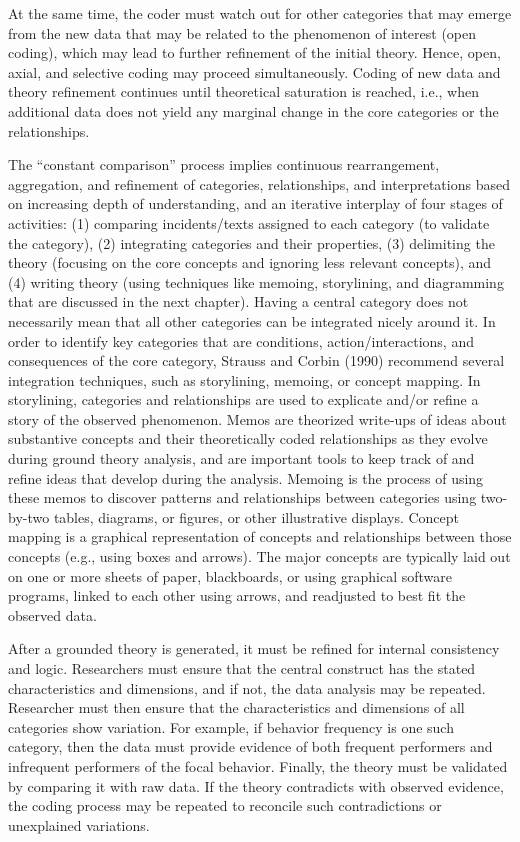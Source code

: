 At the same time, the coder must watch out for other categories that may emerge from the new data that may be related to the phenomenon of interest (open coding), which may lead to further refinement of the initial theory. Hence, open, axial, and selective coding may proceed simultaneously. Coding of new data and theory refinement continues until theoretical saturation is reached, i.e., when additional data does not yield any marginal change in the core categories or the relationships.

The “constant comparison” process implies continuous rearrangement, aggregation, and refinement of categories, relationships, and interpretations based on increasing depth of understanding, and an iterative interplay of four stages of activities: (1) comparing incidents/texts assigned to each category (to validate the category), (2) integrating categories and their properties, (3) delimiting the theory (focusing on the core concepts and ignoring less relevant concepts), and (4) writing theory (using techniques like memoing, storylining, and diagramming that are discussed in the next chapter). Having a central category does not necessarily mean that all other categories can be integrated nicely around it. In order to identify key categories that are conditions, action/interactions, and consequences of the core category, Strauss and Corbin (1990) recommend several integration techniques, such as storylining, memoing, or concept mapping. In storylining, categories and relationships are used to explicate and/or refine a story of the observed phenomenon. Memos are theorized write-ups of ideas about substantive concepts and their theoretically coded relationships as they evolve during ground theory analysis, and are important tools to keep track of and refine ideas that develop during the analysis. Memoing is the process of using these memos to discover patterns and relationships between categories using two-by-two tables, diagrams, or figures, or other illustrative displays. Concept mapping is a graphical representation of concepts and relationships between those concepts (e.g., using boxes and arrows). The major concepts are typically laid out on one or more sheets of paper, blackboards, or using graphical software programs, linked to each other using arrows, and readjusted to best fit the observed data.

After a grounded theory is generated, it must be refined for internal consistency and logic. Researchers must ensure that the central construct has the stated characteristics and dimensions, and if not, the data analysis may be repeated. Researcher must then ensure that the characteristics and dimensions of all categories show variation. For example, if behavior frequency is one such category, then the data must provide evidence of both frequent performers and infrequent performers of the focal behavior. Finally, the theory must be validated by comparing it with raw data. If the theory contradicts with observed evidence, the coding process may be repeated to reconcile such contradictions or unexplained variations. 


